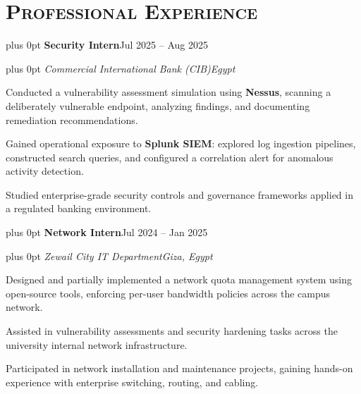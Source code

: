 \documentclass[10pt,letterpaper]{article}
\newcommand{\headerrow}[2]{%
  \begingroup\rightskip=0pt plus 0pt\relax
  #1\hfill #2\par\endgroup}
\newcommand{\entry}[4]{%
  \headerrow{\textbf{#1}}{#2}%
  \headerrow{\textit{#3}}{\textit{#4}}%
  \vspace{0.04em}}
\newenvironment{block}{\vspace{0.03em}\begingroup}{\endgroup\vspace{0.06em}}
\begin{document}
\section*{\textsc{Professional Experience}}
\begin{block}
\entry{Security Intern}{Jul 2025 -- Aug 2025}
      {Commercial International Bank (CIB)}{Egypt}
\begin{tight}
  \item Conducted a vulnerability assessment simulation using \textbf{Nessus}, scanning a deliberately vulnerable endpoint, analyzing findings, and documenting remediation recommendations.
  \item Gained operational exposure to \textbf{Splunk SIEM}: explored log ingestion pipelines, constructed search queries, and configured a correlation alert for anomalous activity detection.
  \item Studied enterprise-grade security controls and governance frameworks applied in a regulated banking environment.
\end{tight}
\vspace{0.18em}

\entry{Network Intern}{Jul 2024 -- Jan 2025}
      {Zewail City IT Department}{Giza, Egypt}
\begin{tight}
  \item Designed and partially implemented a network quota management system using open-source tools, enforcing per-user bandwidth policies across the campus network.
  \item Assisted in vulnerability assessments and security hardening tasks across the university internal network infrastructure.
  \item Participated in network installation and maintenance projects, gaining hands-on experience with enterprise switching, routing, and cabling.
\end{tight}
\end{block}

\end{document}

